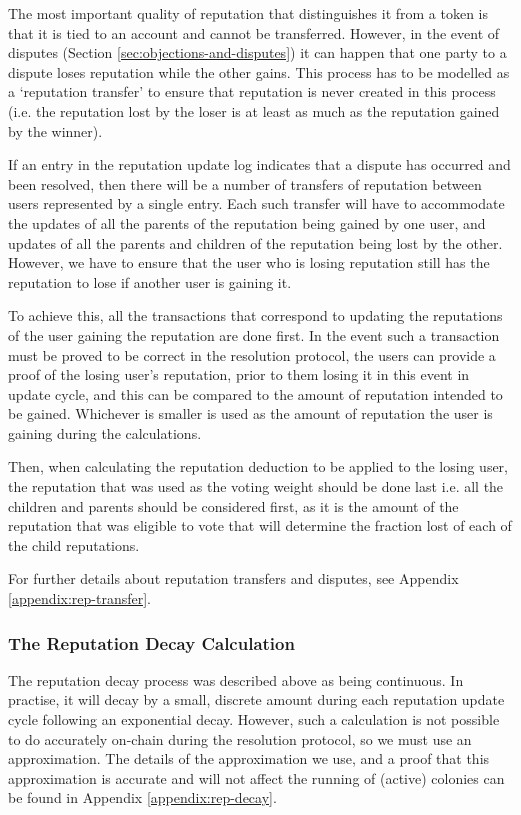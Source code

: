 The most important quality of reputation that distinguishes it from a token is that it is tied to an account and cannot be transferred. However, in the event of disputes (Section \ref{sec:objections-and-disputes}) it can happen that one party to a dispute loses reputation while the other gains. This process has to be modelled as a `reputation transfer' to ensure that reputation is never created in this process (i.e. the reputation lost by the loser is at least as much as the reputation gained by the winner).

If an entry in the reputation update log indicates that a dispute has occurred and been resolved, then there will be a number of transfers of reputation between users represented by a single entry. Each such transfer will have to accommodate the updates of all the parents of the reputation being gained by one user, and updates of all the parents and children of the reputation being lost by the other. However, we have to ensure that the user who is losing reputation still has the reputation to lose if another user is gaining it.

To achieve this, all the transactions that correspond to updating the reputations of the user gaining the reputation are done first. In the event such a transaction must be proved to be correct in the resolution protocol, the users can provide a proof of the losing user's reputation, prior to them losing it in this event in update cycle, and this can be compared to the amount of reputation intended to be gained. Whichever is smaller is used as the amount of reputation the user is gaining during the calculations.

Then, when calculating the reputation deduction to be applied to the losing user, the reputation that was used as the voting weight should be done last i.e. all the children and parents should be considered first, as it is the amount of the reputation that was eligible to vote that will determine the fraction lost of each of the child reputations. %

For further details about reputation transfers and disputes, see Appendix \ref{appendix:rep-transfer}.

\subsubsection{The Reputation Decay Calculation}\label{sec:repdecay}
The reputation decay process was described above as being continuous. In practise, it will decay by a small, discrete amount during each reputation update cycle following an exponential decay. However, such a calculation is not possible to do accurately on-chain during the resolution protocol, so we must use an approximation. The details of the approximation we use, and a proof that this approximation is accurate and will not affect the running of (active) colonies can be found in Appendix \ref{appendix:rep-decay}.

